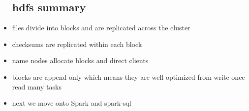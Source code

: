 \documentclass{article}
\begin{document}
\begin{itemize}
\subsection*{hdfs summary}
\item files divide into blocks and are replicated across the cluster
\item checksums are replicated within each block 
\item name nodes allocate blocks and direct clients 
\item blocks are append only which means they are well optimized from write once read many tasks 
\item next we move onto Spark and spark-sql
\end{itemize}
\end{document}

